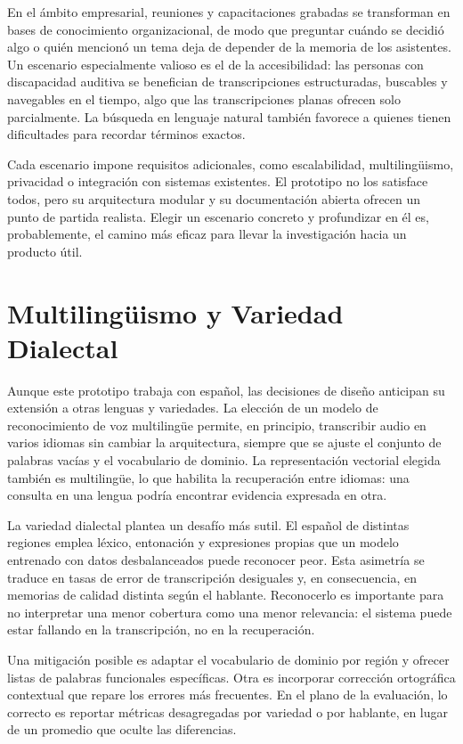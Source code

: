 \documentclass[12pt,a4paper]{article}
\begin{document}
En el ámbito empresarial, reuniones y capacitaciones grabadas se transforman en bases de conocimiento organizacional, de modo que preguntar cuándo se decidió algo o quién mencionó un tema deja de depender de la memoria de los asistentes. Un escenario especialmente valioso es el de la accesibilidad: las personas con discapacidad auditiva se benefician de transcripciones estructuradas, buscables y navegables en el tiempo, algo que las transcripciones planas ofrecen solo parcialmente. La búsqueda en lenguaje natural también favorece a quienes tienen dificultades para recordar términos exactos.

Cada escenario impone requisitos adicionales, como escalabilidad, multilingüismo, privacidad o integración con sistemas existentes. El prototipo no los satisface todos, pero su arquitectura modular y su documentación abierta ofrecen un punto de partida realista. Elegir un escenario concreto y profundizar en él es, probablemente, el camino más eficaz para llevar la investigación hacia un producto útil.



\section{Multilingüismo y Variedad Dialectal}
\label{sec:multiling}

Aunque este prototipo trabaja con español, las decisiones de diseño anticipan su extensión a otras lenguas y variedades. La elección de un modelo de reconocimiento de voz multilingüe permite, en principio, transcribir audio en varios idiomas sin cambiar la arquitectura, siempre que se ajuste el conjunto de palabras vacías y el vocabulario de dominio. La representación vectorial elegida también es multilingüe, lo que habilita la recuperación entre idiomas: una consulta en una lengua podría encontrar evidencia expresada en otra.

La variedad dialectal plantea un desafío más sutil. El español de distintas regiones emplea léxico, entonación y expresiones propias que un modelo entrenado con datos desbalanceados puede reconocer peor. Esta asimetría se traduce en tasas de error de transcripción desiguales y, en consecuencia, en memorias de calidad distinta según el hablante. Reconocerlo es importante para no interpretar una menor cobertura como una menor relevancia: el sistema puede estar fallando en la transcripción, no en la recuperación.

Una mitigación posible es adaptar el vocabulario de dominio por región y ofrecer listas de palabras funcionales específicas. Otra es incorporar corrección ortográfica contextual que repare los errores más frecuentes. En el plano de la evaluación, lo correcto es reportar métricas desagregadas por variedad o por hablante, en lugar de un promedio que oculte las diferencias.
\end{document}
